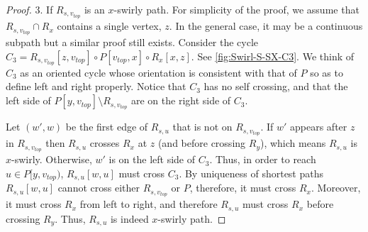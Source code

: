 \documentclass{article}
\begin{document}
\begin{proof}
3.  If $R_{s,v_{top}}$ is an $x$-swirly path.
For simplicity of the proof, we assume that $R_{s,v_{top}}\cap R_x$ contains a single vertex, $z$.
In the general case, it may be a continuous subpath but a similar proof still exists.
Consider the cycle $C_3=R_{s,v_{top}}[z,v_{top}]\circ P[v_{top},x]\circ R_x[x,z]$. See \cref{fig:Swirl-S-SX-C3}.
We think of $C_3$ as an oriented cycle whose orientation is consistent with that of $P$ so as to define left and right properly.
Notice that $C_3$ has no self crossing, and that the left side of $P[y,v_{top}]\setminus R_{s,v_{top}}$ are on the right side of $C_3$.

Let $(w',w)$ be the first edge of $R_{s,u}$ that is not on $R_{s,v_{top}}$.
If $w'$ appears after $z$ in $R_{s,v_{top}}$ then $R_{s,u}$ crosses $R_x$ at $z$ (and before crossing $R_y$), which means $R_{s,u}$ is $x$-swirly.
Otherwise, $w'$ is on the left side of $C_3$.
Thus, in order to reach $u\in P[y,v_{top})$, $R_{s,u}[w,u]$ must cross $C_3$.
By uniqueness of shortest paths  $R_{s,u}[w,u]$ cannot cross either $R_{s,v_{top}}$ or $P$, therefore, it must cross $R_x$.
Moreover, it must cross $R_x$ from left to right, and therefore $R_{s,u}$ must cross $R_x$ before crossing $R_y$.
Thus, $R_{s,u}$ is indeed $x$-swirly path. \qedhere
\end{proof}
\end{document}
